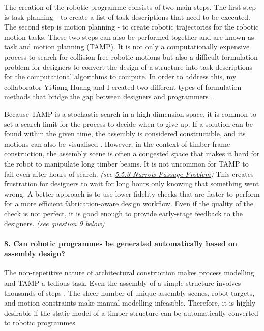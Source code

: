The creation of the robotic programme consists of two main steps. The first step is task planning - to create a list of task descriptions that need to be executed. The second step is motion planning - to create robotic trajectories for the robotic motion tasks. These two steps can also be performed together and are known as task and motion planning (TAMP). It is not only a computationally expensive process to search for collision-free robotic motions but also a difficult formulation problem for designers to convert the design of a structure into task descriptions for the computational algorithms to compute. In order to address this, my collaborator YiJiang Huang and I created two different types of formulation methods that bridge the gap between designers and programmers .

Because TAMP is a stochastic search in a high-dimension space, it is common to set a search limit for the process to decide when to give up. If a solution can be found within the given time, the assembly is considered constructible, and its motions can also be visualised . However, in the context of timber frame construction, the assembly scene is often a congested space that makes it hard for the robot to manipulate long timber beams. It is not uncommon for TAMP to fail even after hours of search. \textit{(see \ul{5.5.3 Narrow Passage Problem}) }This creates frustration for designers to wait for long hours only knowing that something went wrong. A better approach is to use lower-fidelity checks that are faster to perform for a more efficient fabrication-aware design workflow. Even if the quality of the check is not perfect, it is good enough to provide early-stage feedback to the designers. \textit{(see \ul{question 9 below})}

\paragraph{8. Can robotic programmes be generated automatically based on assembly design?}

The non-repetitive nature of architectural construction makes process modelling and TAMP a tedious task. Even the assembly of a simple structure involves thousands of steps . The sheer number of unique assembly scenes, robot targets, and motion constraints make manual modelling infeasible. Therefore, it is highly desirable if the static model of a timber structure can be automatically converted to robotic programmes.

